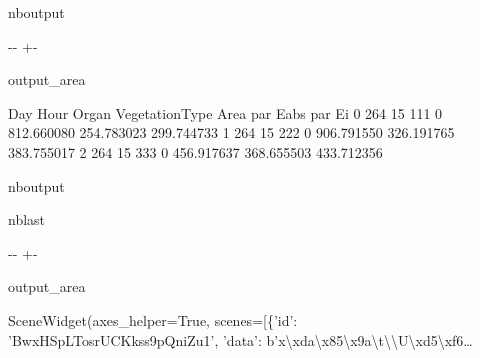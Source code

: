 \documentclass[letterpaper,10pt,english]{sphinxmanual}
\begin{document}
\begin{sphinxuseclass}{nboutput}
{

\kern-\sphinxverbatimsmallskipamount\kern-\baselineskip
\kern+\FrameHeightAdjust\kern-\fboxrule
\vspace{\nbsphinxcodecellspacing}

\begin{sphinxuseclass}{output_area}
\begin{sphinxuseclass}{}


\begin{sphinxVerbatim}[commandchars=\\\{\}]
   Day  Hour  Organ  VegetationType        Area    par Eabs      par Ei
0  264    15    111               0  812.660080  254.783023  299.744733
1  264    15    222               0  906.791550  326.191765  383.755017
2  264    15    333               0  456.917637  368.655503  433.712356
\end{sphinxVerbatim}



\end{sphinxuseclass}
\end{sphinxuseclass}
}

\end{sphinxuseclass}
\begin{sphinxuseclass}{nboutput}
\begin{sphinxuseclass}{nblast}
{

\kern-\sphinxverbatimsmallskipamount\kern-\baselineskip
\kern+\FrameHeightAdjust\kern-\fboxrule
\vspace{\nbsphinxcodecellspacing}

\begin{sphinxuseclass}{output_area}
\begin{sphinxuseclass}{}


\begin{sphinxVerbatim}[commandchars=\\\{\}]
\llap{\color{nbsphinxout}[5]:\,\hspace{\fboxrule}\hspace{\fboxsep}}SceneWidget(axes\_helper=True, scenes=[\{'id': 'BwxHSpLTosrUCKkss9pQniZu1', 'data': b'x\textbackslash{}xda\textbackslash{}x85\textbackslash{}x9a\textbackslash{}t\textbackslash{}\textbackslash{}U\textbackslash{}xd5\textbackslash{}xf6…
\end{sphinxVerbatim}



\end{sphinxuseclass}
\end{sphinxuseclass}
}

\end{sphinxuseclass}
\end{sphinxuseclass}
\end{document}
